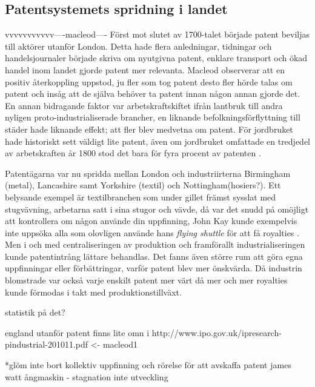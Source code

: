 
\subsection{Patentsystemets spridning i landet} %
\label{sub:patentsystemets_spridning_i_landet}

vvvvvvvvvvv----macleod----
Först mot slutet av 1700-talet började patent beviljas till aktörer utanför London. Detta hade flera
anledningar, tidningar och handelsjournaler började skriva om nyutgivna patent, enklare transport och
ökad handel inom landet gjorde patent mer relevanta\cite{macleod}. Macleod observerar att en positiv återkoppling uppstod, ju fler som tog
patent desto fler hörde talas om patent och insåg att de själva behöver ta patent innan någon annan gjorde
det. En annan bidragande faktor var arbetskraftskiftet ifrån lantbruk till andra nyligen
proto-industrialiserade brancher, en liknande befolkningsförflyttning till städer hade liknande effekt;
att fler blev medvetna om patent\cite{macleod}. För jordbruket hade historiskt sett väldigt lite patent, även om
jordbruket omfattade en tredjedel av arbetskraften år 1800 stod det bara för fyra procent av patenten
\cite{macleod2}.

Patentägarna var nu spridda mellan London och industriirterna Birmingham (metal), Lancashire samt
Yorkshire (textil) och Nottingham(hosiers?). Ett belysande exempel är textilbranchen som under gillet
främst sysslat med stugvävning, arbetarna satt i sina stugor och vävde, då var det snudd på omöjligt att
kontrollera om någon använde din uppfinning, John Kay kunde exempelvis inte uppsöka alla som olovligen
använde hans \emph{flying shuttle} för att få royalties \cite{macleod}. Men i och med centraliseringen av produktion och
framförallt industrialiseringen kunde patentintrång lättare behandlas. Det fanns även större rum att göra
egna uppfinningar eller förbättringar, varför patent blev mer önskvärda. Då industrin blomstrade var
också varje enskilt patent mer värt då mer och mer royalties kunde förmodas i takt med
produktionstillväxt.

statistik på det?

england utanför patent finns lite omn i http://www.ipo.gov.uk/ipresearch-pindustrial-201011.pdf <- macleod1


*glöm inte bort kollektiv uppfinning och rörelse för att avskaffa patent james watt ångmaskin -
stagnation inte utveckling

